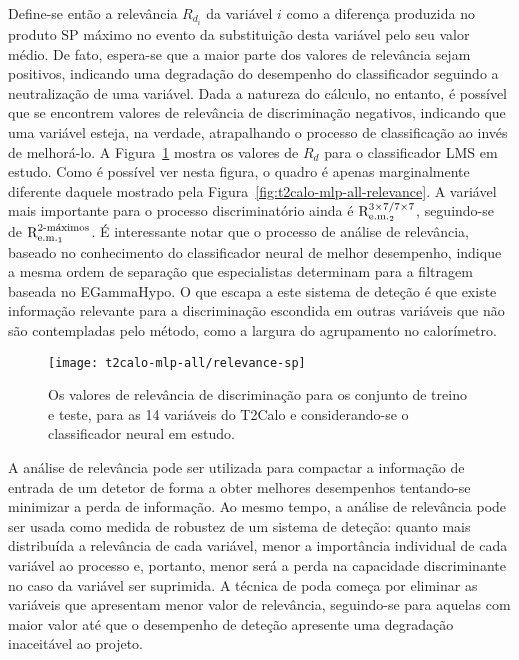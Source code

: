 Define-se então a relevância $R_{d_i}$ da variável $i$ como a diferença
produzida no produto SP máximo no evento da substituição desta variável pelo
seu valor médio. De fato, espera-se que a maior parte dos valores de
relevância sejam positivos, indicando uma degradação do desempenho do
classificador seguindo a neutralização de uma variável. Dada a natureza do
cálculo, no entanto, é possível que se encontrem valores de relevância de
discriminação negativos, indicando que uma variável esteja, na verdade,
atrapalhando o processo de classificação ao invés de melhorá-lo. A
Figura~\ref{fig:t2calo-mlp-all-relevance-disc} mostra os valores de $R_d$ para
o classificador LMS em estudo. Como é possível ver nesta figura, o quadro é
apenas marginalmente diferente daquele mostrado pela
Figura~\ref{fig:t2calo-mlp-all-relevance}. A variável mais importante para o
processo discriminatório ainda é $\rcore$, seguindo-se de $\eratio$. É
interessante notar que o processo de análise de relevância, baseado no
conhecimento do classificador neural de melhor desempenho, indique a mesma
ordem de separação que especialistas determinam para a filtragem baseada no
EGammaHypo. O que escapa a este sistema de deteção é que existe informação
relevante para a discriminação escondida em outras variáveis que não são
contempladas pelo método, como a largura do agrupamento no calorímetro.

\begin{figure}
\begin{center}
\texttt{[image: t2calo-mlp-all/relevance-sp]}
\end{center}
\caption{Os valores de relevância de discriminação para os conjunto de treino e
teste, para as 14 variáveis do T2Calo e considerando-se o classificador neural
em estudo.}
\label{fig:t2calo-mlp-all-relevance-disc}
\end{figure}

A análise de relevância pode ser utilizada para compactar a informação de
entrada de um detetor de forma a obter melhores desempenhos tentando-se
minimizar a perda de informação. Ao mesmo tempo, a análise de relevância pode
ser usada como medida de robustez de um sistema de deteção: quanto mais
distribuída a relevância de cada variável, menor a importância individual de
cada variável ao processo e, portanto, menor será a perda na capacidade
discriminante no caso da variável ser suprimida. A técnica de poda começa por
eliminar as variáveis que apresentam menor valor de relevância, seguindo-se
para aquelas com maior valor até que o desempenho de deteção apresente uma
degradação inaceitável ao projeto.

